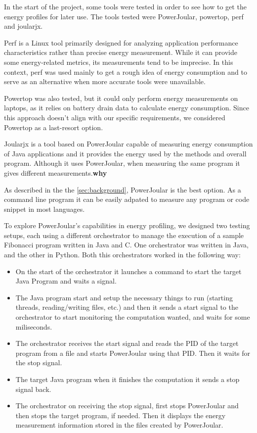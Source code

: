 \documentclass[sigplan]{acmart}
\begin{document}
In the start of the project, some tools were tested in order to see how to get the energy profiles for later use. The tools tested were PowerJoular, powertop, perf and joularjx.

Perf is a Linux tool primarily designed for analyzing application performance characteristics rather than precise energy measurement. While it can provide some energy-related metrics, its measurements tend to be imprecise. In this context, perf was used mainly to get a rough idea of energy consumption and to serve as an alternative when more accurate tools were unavailable.

Powertop was also tested, but it could only perform energy measurements on laptops, as it relies on battery drain data to calculate energy consumption. Since this approach doesn't align with our specific requirements, we considered Powertop as a last-resort option.

Joularjx is a tool based on PowerJoular capable of measuring energy consumption of Java applications and it provides the energy used by the methods and overall program. Although it uses PowerJoular, when measuring the same program it gives different measurements.\textbf{why}

As described in the the \ref{sec:background}, PowerJoular is the best option. As a command line program it can be easily adpated to measure any program or code snippet in most languages.

To explore PowerJoular’s capabilities in energy profiling, we designed two testing setups, each using a different orchestrator to manage the execution of a sample Fibonacci program written in Java and C. One orchestrator was written in Java, and the other in Python. Both this orchestrators worked in the following way: \\


\begin{itemize}
  \item On the start of the orchestrator it launches a command to start the target Java Program and waits a signal.
  \item The Java program start and setup the necessary things to run (starting threads, reading/writing files, etc.) and then it sends a start signal to the orchestrator to start monitoring the computation wanted, and waits for some miliseconds. 
  \item The orchestrator receives the start signal and reads the PID of the target program from a file and starts PowerJoular using that PID. Then it waits for the stop signal.
  \item The target Java program when it finishes the computation it sends a stop signal back.
  \item The orchestrator on receiving the stop signal, first stops PowerJoular and then stops the target program, if needed. Then it displays the energy measurement information stored in the files created by PowerJoular. \\
\end{itemize}
\end{document}
